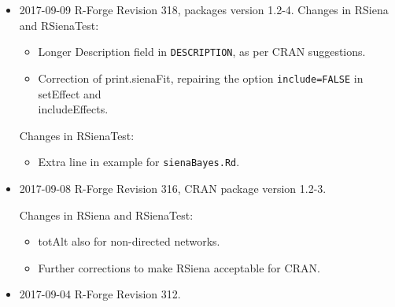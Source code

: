 \documentclass[a4paper,fleqn,11pt]{article}
\newcommand{\+}{\, + \,}
\newcommand{\sfn}[1]{\textsf{#1}}
\begin{document}
\begin{small}
\begin{itemize}
\item 2017-09-09 R-Forge Revision 318, packages version 1.2-4.
Changes in RSiena and RSienaTest:
\begin{itemize}
   \item Longer Description field in \texttt{DESCRIPTION}, as per CRAN suggestions.
   \item Correction of \sfn{print.sienaFit}, repairing the option
        \texttt{include=FALSE}  in \sfn{setEffect} and \\
        \sfn{includeEffects}.
\end{itemize}
Changes in RSienaTest:
\begin{itemize}
   \item Extra line in example for \texttt{sienaBayes.Rd}.
\end{itemize}

\item 2017-09-08 R-Forge Revision 316, CRAN package version 1.2-3.

Changes in RSiena and RSienaTest:
\begin{itemize}
 \item totAlt also for non-directed networks.
 \item Further corrections to make RSiena acceptable for CRAN.
\end{itemize}

\item 2017-09-04 R-Forge Revision 312.


\end{itemize}
\end{small}
\end{document}
